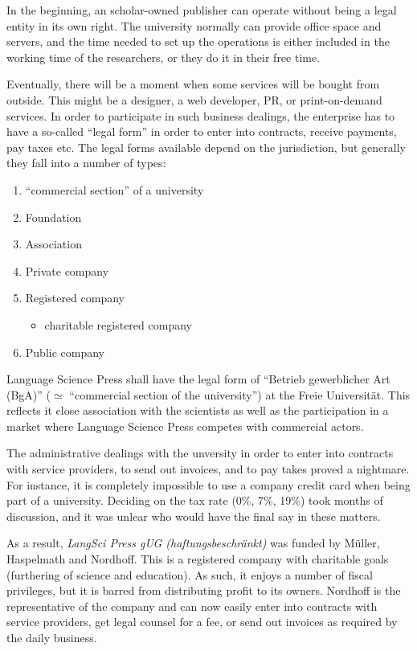 \documentclass[nonflat,smallfont
]{langsci/langscibook}
\newcommand{\background}[1]{ 
  \vspace{5mm}
  \renewcommand{\tblslinecolour}{lsDarkBlue}
  \tblssy[red]{explore2}{Background}{\vspace*{-5mm}#1}
}
\newcommand{\langscisolution}[1]{
  \renewcommand{\tblslinecolour}{lsLightBlue}
  \tblssy{langsci}{LangSci solution}{\vspace*{-5mm}#1}
}
\newcommand{\evaluation}[1]{
  \renewcommand{\tblslinecolour}{lsLightOrange}
  \tblssy{receipt}{Evaluation}{\vspace*{-5mm}#1}
}
\renewcommand{\tblssy}[4][black!12]{%
  \renewcommand{\langscisymbol}{#2}\renewcommand{\tblsboxcolor}{#1}
  \begin{mdframed}[style=yellowexercise,frametitle={#3}]
    #4
  \end{mdframed}
}
\begin{document}
\background{In the beginning, an scholar-owned publisher can operate without being a legal entity in its own right. The university normally can provide office space and servers, and the time needed to set up the operations is either included in the working time of the researchers, or they do it in their free time. 

Eventually, there will be a moment when some services will be bought from outside. This might be a designer, a web developer, PR, or print-on-demand services. In order to participate in such business dealings, the enterprise has to have a so-called ``legal form'' in order to enter into contracts, receive payments, pay taxes etc. The legal forms available depend on the jurisdiction, but generally they fall into a number of types:

\begin{enumerate}
 \item ``commercial section'' of a university
 \item Foundation 
 \item Association 
 \item Private company
 \item Registered company 
 \begin{itemize}
  \item charitable registered company
 \end{itemize}
 \item Public company 
\end{enumerate} 
}
\langscisolution{
Language Science Press shall have the legal form of ``Betrieb gewerblicher Art (BgA)'' ($\simeq$ ``commercial section of the university'') at the Freie Universität.
This reflects it close association with the scientists as well as the participation in a market where Language Science Press competes with commercial actors. 
}
\evaluation{
The administrative dealings with the unversity in order to enter into contracts with service providers, to send out invoices, and to pay takes proved a nightmare. For instance, it is completely impossible to use a company credit card when being part of a university. Deciding on the tax rate (0\%, 7\%, 19\%) took months of discussion, and it was unlear who would have the final say in these matters. 

As a result, \textit{LangSci Press gUG (haftungsbeschränkt)} was funded by Müller, Haspelmath and Nordhoff. This is a registered company with charitable goals (furthering of science and education). As such, it enjoys a number of fiscal privileges, but it is barred from  distributing profit to its owners. Nordhoff is the representative of the company and can now easily enter into contracts with service providers, get legal counsel for a fee, or send out invoices as required by the daily business. 
}
\end{document}
